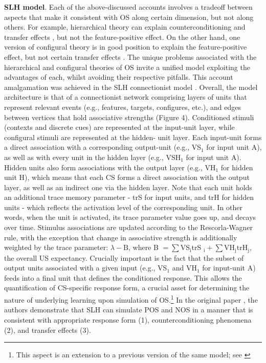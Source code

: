 \documentclass[11pt]{article}
\let\cite=\citep
\let\citeN=\citet
\begin{document}
{\bf SLH model}. Each of the above-discussed accounts involves a tradeoff 
between aspects that make it consistent with OS along certain dimension, but 
not along others. For example, hierarchical theory can explain 
counterconditioning and transfer effects \cite{Bonardi2017}, but not the 
feature-positive effect. On the other hand, one version of configural theory is 
in good position to explain the feature-positive effect, but not certain 
transfer effects \cite{Bonardi2017}. The unique problems associated with the 
hierarchical and configural theories of OS invite a unified model exploiting 
the advantages of each, whilst avoiding their respective pitfalls. This account 
amalgamation was achieved in the SLH connectionist model \cite{Schmajuk1998}. 
Overall, the model architecture is that of a connectionist network comprising 
layers of units that represent relevant events (e.g., features, targets, 
configures, etc.), and edges between vertices that hold associative strengths 
(Figure 4). Conditioned stimuli (contexts and discrete cues) are represented at 
the input-unit layer, while configural stimuli are represented at the hidden-
unit layer. Each input-unit forms a direct association with a corresponding 
output-unit (e.g., VS$_1$ for input unit A), as well as with every unit in the 
hidden layer (e.g., VSH$_1$ for input unit A). Hidden units also form 
associations with the output layer (e.g., VH$_1$ for hidden unit H), which 
means that each CS forms a direct association with the output layer, as well as 
an indirect one via the hidden layer. Note that each unit holds an additional 
trace memory parameter - trS for input units, and trH for hidden units - which 
reflects the activation level of the corresponding unit. In other words, when 
the unit is activated, its trace parameter value goes up, and decays over time. 
Stimulus associations are updated according to the Rescorla-Wagner rule, with 
the exception that change in associative strength is additionally weighted by 
the trace parameter: $\lambda - \text{B}$, where B $= \sum$VS$_{\text{i}}$trS
$_{\text{i}} + \sum$VH$_{\text{j}}$trH$_{\text{j}}$, the overall US expectancy. 
Crucially important is the fact that the subset of output units associated with 
a given input (e.g., VS$_1$ and VH$_1$ for input-unit A) feeds into a final 
unit that defines the conditioned response. This allows the quantification of 
CS-specific response form, a crucial asset for determining the nature of 
underlying learning upon simulation of OS.\footnote{This aspect is an extension 
to a previous version of the same model; see \citeN{Schmajuk1992}} In the 
original paper \cite{Schmajuk1998}, the authors demonstrate that SLH can 
simulate POS and NOS in a manner that is consistent with appropriate response 
form (1), counterconditioning phenomena (2), and transfer effects (3). 
\end{document}
